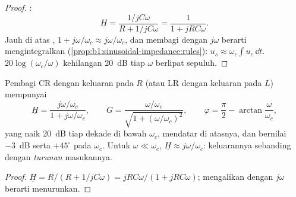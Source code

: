 \begin{proof}
:
\[
\underline H = \frac{1/jC\omega}{R + 1/jC\omega} = \frac{1}{1 + jRC\omega} .
\]
Jauh di atas , $1 + j\omega/\omega_c \approx j\omega/\omega_c$,
dan membagi  dengan $j\omega$ berarti mengintegralkan
(\cref{prop:b1:sinusoidal-impedance:rules}): $u_s \approx \omega_c\int u_e\,\dd t$.
$20\log(\omega_c/\omega)$ kehilangan \qty{20}{dB} tiap $\omega$ berlipat sepuluh.
\end{proof}

\begin{proposition}\label{prop:b1:filters-transfer-functions:highpass1}
Pembagi CR dengan keluaran pada $R$ (atau LR dengan keluaran pada $L$)
mempunyai
\[
\underline H = \frac{j\omega/\omega_c}{1 + j\omega/\omega_c},
\qquad G = \frac{\omega/\omega_c}{\sqrt{1 + (\omega/\omega_c)^2}},
\qquad \varphi = \frac{\pi}{2} - \arctan\frac{\omega}{\omega_c},
\]
yang naik \qty{20}{dB} tiap dekade di bawah $\omega_c$, mendatar di
atasnya, dan bernilai \qty{-3}{dB} serta $+45^\circ$ pada $\omega_c$.
Untuk $\omega \ll \omega_c$, $\underline H
\approx j\omega/\omega_c$: keluarannya sebanding dengan
\emph{turunan} masukannya.
\end{proposition}

\begin{proof}
$\underline H = R/(R + 1/jC\omega) = jRC\omega/(1 + jRC\omega)$;
mengalikan dengan $j\omega$ berarti menurunkan.
\end{proof}

